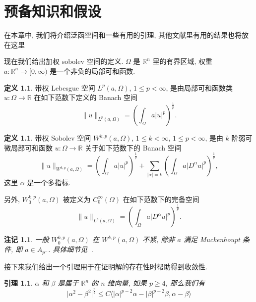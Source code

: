 \documentclass[twoside,longtitle]{LZUthesis}
\newtheorem{lemma}[theorem]{引理}
\newtheorem{remark}[theorem]{注记}
\theoremstyle{definition}
\newtheorem{definition}[theorem]{定义}
\numberwithin{equation}{chapter}
\newcommand*\abs[1]{\lvert#1\rvert}
\newcommand*\norm[1]{\lVert#1\rVert}
\newcommand\R{\mathbb{R}}
\begin{document}
\chapter{预备知识和假设}\label{ch:preliminaries}
在本章中, 我们将介绍泛函空间和一些有用的引理,
其他文献里有用的结果也将放在这里

现在我们给出加权 sobolev 空间的定义.
$\Omega$ 是 $\R^n$ 里的有界区域, 权重
$a \colon \R^n \to [0, \infty)$
是一个非负的局部可和函数.
\begin{definition}
	带权 Lebesgue 空间 $L^p(a, \Omega)$, $1 \leq p < \infty$,
	是由局部可和函数类
	$u \colon \Omega \to \R$ 在如下范数下定义的 Banach 空间
	\begin{equation}
		\norm{u}_{L^p(a,\Omega)} =
		\left( \int_{\Omega}a\abs{u}^p \right)^{\frac{1}{p}}.
	\end{equation}
\end{definition}
\begin{definition}
	带权 Sobolev 空间 $W^{k,p}(a,\Omega)$,
	$1 \leq k < \infty$, $1 \leq p < \infty$,
	是由 $k$ 阶弱可微局部可和函数
	$u \colon \Omega \to \R$ 关于如下范数下的 Banach 空间
	\begin{equation}
		\norm{u}_{W^{k,p}(a,\Omega)} =
		\left( \int_{\Omega}a\abs{u}^p \right)^{\frac{1}{p}}
		+ \sum_{\abs{\alpha}=k}
		\left( \int_{\Omega}a\abs{D^{\alpha}u}^p \right)^{\frac{1}{p}},
	\end{equation}
	这里 $\alpha$ 是一个多指标.

	另外,
	$W_0^{k,p}(a,\Omega)$ 被定义为
	$C_0^{\infty}(\Omega)$ 在如下范数下的完备空间
	\begin{equation}
		\norm{u}_{L^p(a,\Omega)} =
		\left( \int_{\Omega}a\abs{D^{\alpha}u}^p \right)^{\frac{1}{p}}.
	\end{equation}
\end{definition}
\begin{remark}
	一般 $W_0^{k,p}(a,\Omega)$ 在
	$W^{k,p}(a,\Omega)$ 不紧, 除非 $a$ 满足 Muckenhoupt 条件, 即 $a \in A_{p^-}$. 具体细节见~\cite{goldshteinWeightedSobolevSpaces2009}.
\end{remark}
接下来我们给出一个引理用于在证明解的存在性时帮助得到收敛性.
\begin{lemma}\label{lem:VecIneq}
	$\alpha$ 和 $\beta$ 是属于 $\R^{n}$ 的 $n$ 维向量, 如果 $p \geq 4$, 那么我们有
	\begin{equation}
		\abs{\alpha^2 - \beta^2}^{\frac{p}{2}}
		\leq C \langle \abs{\alpha}^{p-2}\alpha - \abs{\beta}^{p-2}\beta, \alpha-\beta\rangle
	\end{equation}
\end{lemma}
\end{document}

